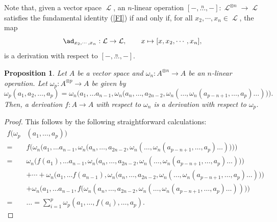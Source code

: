 \documentclass[12pt, reqno]{amsart}
\newtheorem{proposition}[definition]{Proposition}
\def\ele{\operatorname{\mathcal{L}}}
\begin{document}
Note that, given a vector space ${\ele}$, an $n$-linear operation $[-,\stackrel{n}\dots,-] : {\ele}^{\otimes n} \to {\ele}$ satisfies the fundamental identity (\ref{FI})  if and only if, for all $x_2,\cdots, x_{n}\in {\ele}$, the map
\begin{equation}\label{ad}
\ad_{x_2,\cdots, x_{n}}:{\ele}\to {\ele}, \qquad x\mapsto [x,x_2,\cdots, x_{n}],
\end{equation}
is a derivation with respect to $[-,\stackrel{n}\dots,-]$.


\begin{proposition} \label{derivation}
Let $A$ be a vector space and $\omega_n : A^{\otimes n} \to A$ be an $n$-linear operation. Let $\omega_p :A^{\otimes p} \to A$
be given by
\begin{equation} \label{structure}
\omega_p(a_1,a_2,\dots,a_{p})
  =\omega_n\Big(a_1, \dots a_{n-1},\omega_n\big(a_n, \dots, a_{2n-2}, \omega_n(\dots,\omega_n(a_{p-n+1}, \dots, a_{p}) \dots)\big)\Big).
\end{equation}
Then, a derivation $f:A\to A$ with respect to $\omega_n$ is a derivation with respect  to $\omega_p$.
\end{proposition}
\begin{proof} This follows by the following straightforward calculations:
\begin{align*}
f(\omega_p &(a_1,\dots,a_{p})) \\
= & f\Big(\omega_n\Big(a_1, \dots a_{n-1},\omega_n\big(a_n, \dots, a_{2n-2}, \omega_n(\dots,\omega_n(a_{p-n+1}, \dots, a_{p}) \dots)\big)\Big)\Big)\\
 = & \omega_n\Big(f(a_1), \dots a_{n-1},\omega_n\big(a_n, \dots,a_{2n-2},\omega_n( \dots,\omega_n(a_{p-n+1}, \dots, a_{p}) \dots)\big)\Big) \\
  &+\cdots +\omega_n\Big(a_1, \dots f(a_{n-1}),\omega_n\big(a_n, \dots,a_{2n-2},\omega_n( \dots,\omega_n(a_{p-n+1}, \dots, a_{p}) \dots)\big)\Big) \\
   &+\omega_n\Big(a_1, \dots a_{n-1},f\big(\omega_n(a_n, \dots,a_{2n-2},\omega_n( \dots,\omega_n(a_{p-n+1}, \dots, a_{p}) \dots))\big)\Big) \\
 = &\dots = \sum_{i=1}^{p} \omega_p(a_1, \dots, f(a_i), \dots,a_{p}).
\end{align*}
\end{proof}
\end{document}
